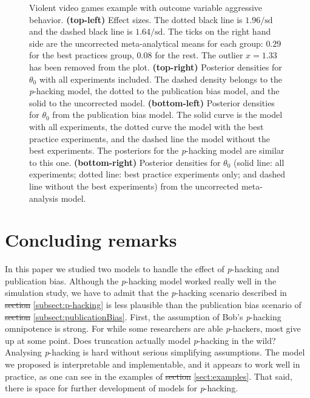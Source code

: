 \documentclass[useAMS,usenatbib,referee]{biom}
\providecommand{\DIFaddtex}[1]{{\protect\color{green}\uwave{#1}}} %
\providecommand{\DIFdeltex}[1]{{\protect\color{red}\sout{#1}}}                      %
\providecommand{\DIFaddbegin}{} %
\providecommand{\DIFaddend}{} %
\providecommand{\DIFdelbegin}{} %
\providecommand{\DIFdelend}{} %
\providecommand{\DIFadd}[1]{\texorpdfstring{\DIFaddtex{#1}}{#1}} %
\providecommand{\DIFdel}[1]{\texorpdfstring{\DIFdeltex{#1}}{}} %
\begin{document}
\begin{figure}
\caption{\label{fig:anderson2010}Violent video games example with outcome variable aggressive behavior. \textbf{(top-left)} Effect sizes. The dotted black line is $1.96/\textrm{sd}$ and the dashed black line is $1.64/\textrm{sd}$. The ticks on the right hand side are the uncorrected meta-analytical means for each group: $0.29$ for the best practices group, $0.08$ for the rest. The outlier $x=1.33$ has been removed from the plot.
\textbf{(top-right)} Posterior densities for $\theta_{0}$ with all experiments included. The dashed density belongs to the \textit{p}-hacking model, the dotted to the publication bias model, and the solid to the uncorrected model. \textbf{(bottom-left)} Posterior densities for $\theta_{0}$ from the publication bias model. The solid curve is the model with all experiments, the dotted curve the model with the best practice experiments, and the dashed line the model without the best experiments. The posteriors for the \textit{p}-hacking model are similar to this one. \textbf{(bottom-right)} Posterior densities for $\theta_{0}$ (solid line: all experiments; dotted line: best practice experiments only; and dashed line without the best experiments) from the uncorrected meta-analysis model.}
\end{figure}

\section{Concluding remarks}\label{sect:conclusions}

In this paper we studied two models to handle the effect of \textit{p}-hacking and publication bias. Although the \textit{p}-hacking model worked really well in the simulation study, we have to admit that the \textit{p}-hacking scenario described in \DIFdelbegin \DIFdel{section }\DIFdelend \DIFaddbegin \DIFadd{Section }\DIFaddend \ref{subsect:p-hacking} is less plausible than the publication bias scenario of \DIFdelbegin \DIFdel{section }\DIFdelend \DIFaddbegin \DIFadd{Section }\DIFaddend \ref{subsect:publicationBias}. First, the assumption of Bob's \textit{p}-hacking omnipotence is strong. For while some researchers are able \textit{p}-hackers, most give up at some point. Does truncation actually model \textit{p}-hacking in the wild? Analysing \textit{p}-hacking is hard without serious simplifying assumptions. The model we proposed is interpretable and implementable, and it appears to work well in practice, as one can see in the examples of \DIFdelbegin \DIFdel{section }\DIFdelend \DIFaddbegin \DIFadd{Section }\DIFaddend \ref{sect:examples}. That said, there is space for further development of models for \textit{p}-hacking.
\end{document}
